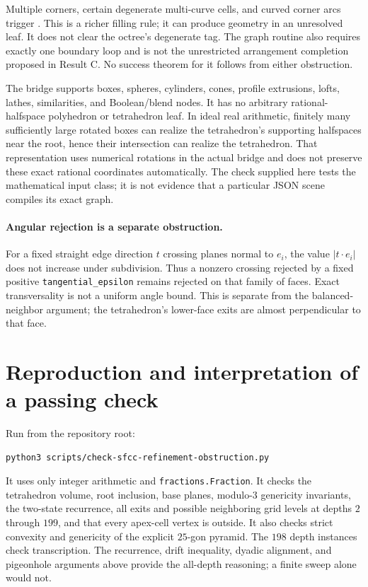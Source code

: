 \documentclass[11pt]{article}
\begin{document}
\begin{description}[style=nextline,leftmargin=0pt,labelwidth=0pt,labelsep=0pt]
\item[Fallback: \path{sfcc/cell_mesh.rs}, \texttt{mesh\_cells\_subset}.]
Multiple corners, certain degenerate multi-curve cells, and curved
corner arcs trigger . This is a richer
filling rule; it can produce geometry in an unresolved leaf. It does
not clear the octree's degenerate tag. The graph routine also requires
exactly one boundary loop and is not the unrestricted arrangement
completion proposed in Result C. No success theorem for it follows
from either obstruction.

\item[Input class: \path{scene_bridge.rs}, \texttt{BridgeNode}.]
The bridge supports boxes, spheres, cylinders, cones, profile
extrusions, lofts, lathes, similarities, and Boolean/blend nodes. It
has no arbitrary rational-halfspace polyhedron or tetrahedron leaf.
In ideal real arithmetic, finitely many sufficiently large rotated
boxes can realize the tetrahedron's supporting halfspaces near the
root, hence their intersection can realize the tetrahedron. That
representation uses numerical rotations in the actual bridge and
does not preserve these exact rational coordinates automatically.
The check supplied here tests the mathematical input class; it is
not evidence that a particular JSON scene compiles its exact graph.
\end{description}

\paragraph{Angular rejection is a separate obstruction.}
For a fixed straight edge direction $t$ crossing planes normal to
$e_i$, the value $|t\cdot e_i|$ does not increase under subdivision.
Thus a nonzero crossing rejected by a fixed positive
\texttt{tangential\_epsilon} remains rejected on that family of
faces. Exact transversality is not a uniform angle bound. This is
separate from the balanced-neighbor argument; the tetrahedron's
lower-face exits are almost perpendicular to that face.

\section{Reproduction and interpretation of a passing check}

Run from the repository root:
\begin{verbatim}
python3 scripts/check-sfcc-refinement-obstruction.py
\end{verbatim}
It uses only integer arithmetic and \texttt{fractions.Fraction}.
It checks the tetrahedron volume, root inclusion, base planes,
modulo-$3$ genericity invariants, the two-state recurrence, all exits
and possible neighboring grid levels at depths $2$ through $199$,
and that every apex-cell vertex is outside. It also checks strict
convexity and genericity of the explicit $25$-gon pyramid.
The $198$ depth instances check transcription. The recurrence,
drift inequality, dyadic alignment, and pigeonhole arguments above
provide the all-depth reasoning; a finite sweep alone would not.
\end{document}
